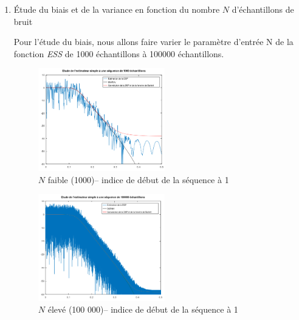 \documentclass{article}
\begin{document}
\begin{enumerate}
\renewcommand{\theenumi}{\Alph{enumi}}
\item Étude du biais et de la variance en fonction du nombre $N$ d'échantillons de bruit

Pour l'étude du biais, nous allons faire varier le paramètre d'entrée N de la fonction \textit{ESS} de 1000 échantillons à 100000 échantillons.

\begin{figure}[h]
\centerline{\includegraphics[width=0.52\textwidth]{images/casESN1000.png}}
\caption{$N$ faible (1000)-- indice de début de la séquence à 1}
\end{figure}

\begin{figure}[h]
\centerline{\includegraphics[width=0.52\textwidth]{images/casESN100000.png}}
\caption{$N$ élevé (100 000)-- indice de début de la séquence à 1}
\end{figure}


\end{enumerate}
\end{document}
